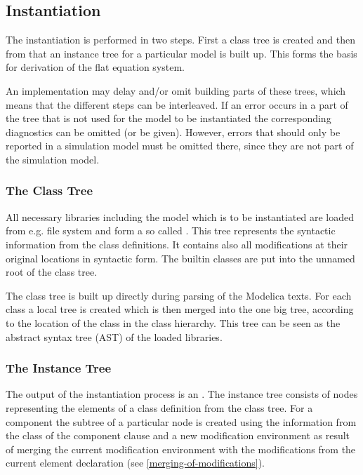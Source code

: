 \subsection{Instantiation}

The instantiation is performed in two steps. First a class tree is
created and then from that an instance tree for a particular model is
built up. This forms the basis for derivation of the flat equation
system.

An implementation may delay and/or omit building parts of these trees,
which means that the different steps can be interleaved. If an error
occurs in a part of the tree that is not used for the model to be
instantiated the corresponding diagnostics can be omitted (or be given).
However, errors that should only be reported in a simulation model must
be omitted there, since they are not part of the simulation model.

\subsubsection{The Class Tree}

All necessary libraries including the model which is to be instantiated
are loaded from e.g. file system and form a so called .
This tree represents the syntactic information from the
class definitions. It contains also all modifications at their original
locations in syntactic form. The builtin classes are put into the unnamed root of the class tree.

\begin{nonnormative}
The class tree is built up directly during parsing of the Modelica texts.  For each class a local tree is created which is then merged into the one big tree, according
to the location of the class in the class hierarchy.  This tree can be seen as the abstract syntax tree (AST) of the loaded libraries.
\end{nonnormative}

\subsubsection{The Instance Tree}

The output of the instantiation process is an .
The instance tree consists of nodes representing the elements of a class
definition from the class tree. For a component the subtree of a
particular node is created using the information from the class of the
component clause and a new modification environment as result of merging
the current modification environment with the modifications from the
current element declaration (see \autoref{merging-of-modifications}).


